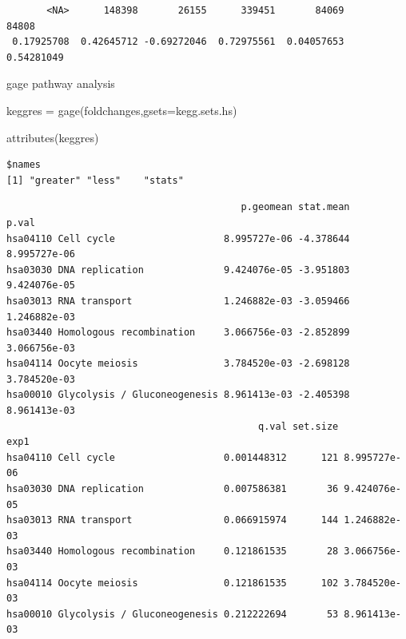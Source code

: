 \documentclass[
  letterpaper,
  DIV=11,
  numbers=noendperiod]{scrartcl}
\newenvironment{Shaded}{\begin{snugshade}}{\end{snugshade}}
\newcommand{\AttributeTok}[1]{\textcolor[rgb]{0.40,0.45,0.13}{#1}}
\newcommand{\FunctionTok}[1]{\textcolor[rgb]{0.28,0.35,0.67}{#1}}
\newcommand{\NormalTok}[1]{\textcolor[rgb]{0.00,0.23,0.31}{#1}}
\newcommand{\OtherTok}[1]{\textcolor[rgb]{0.00,0.23,0.31}{#1}}
\newcommand{\SpecialCharTok}[1]{\textcolor[rgb]{0.37,0.37,0.37}{#1}}
\begin{document}
\begin{verbatim}
       <NA>      148398       26155      339451       84069       84808 
 0.17925708  0.42645712 -0.69272046  0.72975561  0.04057653  0.54281049 
\end{verbatim}

gage pathway analysis

\begin{Shaded}
\begin{Highlighting}[]
\NormalTok{keggres }\OtherTok{=} \FunctionTok{gage}\NormalTok{(foldchanges,}\AttributeTok{gsets=}\NormalTok{kegg.sets.hs)}

\FunctionTok{attributes}\NormalTok{(keggres)}
\end{Highlighting}
\end{Shaded}

\begin{verbatim}
$names
[1] "greater" "less"    "stats"  
\end{verbatim}

\begin{Shaded}
\end{Shaded}

\begin{verbatim}
                                         p.geomean stat.mean        p.val
hsa04110 Cell cycle                   8.995727e-06 -4.378644 8.995727e-06
hsa03030 DNA replication              9.424076e-05 -3.951803 9.424076e-05
hsa03013 RNA transport                1.246882e-03 -3.059466 1.246882e-03
hsa03440 Homologous recombination     3.066756e-03 -2.852899 3.066756e-03
hsa04114 Oocyte meiosis               3.784520e-03 -2.698128 3.784520e-03
hsa00010 Glycolysis / Gluconeogenesis 8.961413e-03 -2.405398 8.961413e-03
                                            q.val set.size         exp1
hsa04110 Cell cycle                   0.001448312      121 8.995727e-06
hsa03030 DNA replication              0.007586381       36 9.424076e-05
hsa03013 RNA transport                0.066915974      144 1.246882e-03
hsa03440 Homologous recombination     0.121861535       28 3.066756e-03
hsa04114 Oocyte meiosis               0.121861535      102 3.784520e-03
hsa00010 Glycolysis / Gluconeogenesis 0.212222694       53 8.961413e-03
\end{verbatim}

\begin{Shaded}
\end{Shaded}
\end{document}
